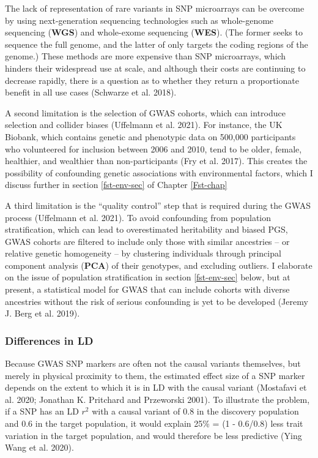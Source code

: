 \documentclass[
]{book}
\begin{document}
The lack of representation of rare variants in SNP microarrays can be overcome by using next-generation sequencing technologies such as whole-genome sequencing (\textbf{WGS}) and whole-exome sequencing (\textbf{WES}). (The former seeks to sequence the full genome, and the latter of only targets the coding regions of the genome.) These methods are more expensive than SNP microarrays, which hinders their widespread use at scale, and although their costs are continuing to decrease rapidly, there is a question as to whether they return a proportionate benefit in all use cases (Schwarze et al. 2018).

A second limitation is the selection of GWAS cohorts, which can introduce selection and collider biases (Uffelmann et al. 2021). For instance, the UK Biobank, which contains genetic and phenotypic data on 500,000 participants who volunteered for inclusion between 2006 and 2010, tend to be older, female, healthier, and wealthier than non-participants (Fry et al. 2017). This creates the possibility of confounding genetic associations with environmental factors, which I discuss further in section \ref{fst-env-sec} of Chapter \ref{Fst-chap}

A third limitation is the ``quality control'' step that is required during the GWAS process (Uffelmann et al. 2021). To avoid confounding from population stratification, which can lead to overestimated heritability and biased PGS, GWAS cohorts are filtered to include only those with similar ancestries -- or relative genetic homogeneity -- by clustering individuals through principal component analysis (\textbf{PCA}) of their genotypes, and excluding outliers. I elaborate on the issue of population stratification in section \ref{fst-env-sec} below, but at present, a statistical model for GWAS that can include cohorts with diverse ancestries without the risk of serious confounding is yet to be developed (Jeremy J. Berg et al. 2019).

\hypertarget{differences-in-ld}{%
\subsubsection{Differences in LD}\label{differences-in-ld}}

Because GWAS SNP markers are often not the causal variants themselves, but merely in physical proximity to them, the estimated effect size of a SNP marker depends on the extent to which it is in LD with the causal variant (Mostafavi et al. 2020; Jonathan K. Pritchard and Przeworski 2001). To illustrate the problem, if a SNP has an LD \(r^2\) with a causal variant of 0.8 in the discovery population and 0.6 in the target population, it would explain 25\% = (1 - 0.6/0.8) less trait variation in the target population, and would therefore be less predictive (Ying Wang et al. 2020).
\end{document}
